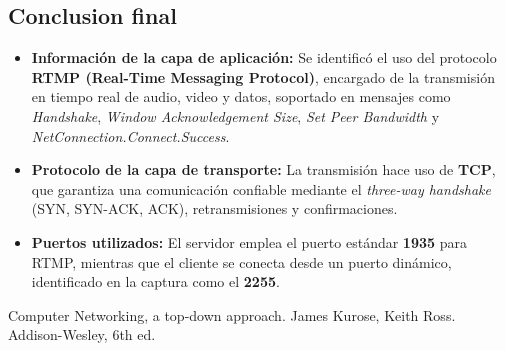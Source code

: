 \documentclass[10pt]{article}
\begin{document}
\subsection*{Conclusion final}

\begin{itemize}
    \item \textbf{Información de la capa de aplicación:} Se identificó el uso del protocolo 
    \textbf{RTMP (Real-Time Messaging Protocol)}, encargado de la transmisión en tiempo real 
    de audio, video y datos, soportado en mensajes como \textit{Handshake}, 
    \textit{Window Acknowledgement Size}, \textit{Set Peer Bandwidth} y 
    \textit{NetConnection.Connect.Success}.
    
    \item \textbf{Protocolo de la capa de transporte:} La transmisión hace uso de 
    \textbf{TCP}, que garantiza una comunicación confiable mediante el 
    \textit{three-way handshake} (SYN, SYN-ACK, ACK), retransmisiones y confirmaciones.
    
    \item \textbf{Puertos utilizados:} El servidor emplea el puerto estándar 
    \textbf{1935} para RTMP, mientras que el cliente se conecta desde un puerto dinámico, 
    identificado en la captura como el \textbf{2255}.
\end{itemize}





\begin{thebibliography}{9}


  Computer Networking, a top-down approach. James Kurose, Keith Ross. Addison-Wesley, 6th ed.

  \end{thebibliography}
\end{document}
